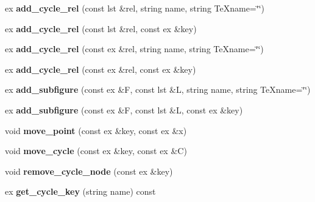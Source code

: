 \begin{DoxyCompactItemize}
ex {\bfseries add\+\_\+cycle\+\_\+rel} (const lst \&rel, string name, string Te\+Xname=\char`\"{}\char`\"{})
\item 
\mbox{\label{class_moeb_inv_1_1figure_a16ef45ff448be79c670c248b8d981ea4}} 
ex {\bfseries add\+\_\+cycle\+\_\+rel} (const lst \&rel, const ex \&key)
\item 
\mbox{\label{class_moeb_inv_1_1figure_ab0f2c91151c526ac334d3c60ceef6ce9}} 
ex {\bfseries add\+\_\+cycle\+\_\+rel} (const ex \&rel, string name, string Te\+Xname=\char`\"{}\char`\"{})
\item 
\mbox{\label{class_moeb_inv_1_1figure_a5f5ba6a6f2501cf2e9b11387e381e754}} 
ex {\bfseries add\+\_\+cycle\+\_\+rel} (const ex \&rel, const ex \&key)
\item 
\mbox{\label{class_moeb_inv_1_1figure_ae479f412608709773b1162261f441386}} 
ex {\bfseries add\+\_\+subfigure} (const ex \&F, const lst \&L, string name, string Te\+Xname=\char`\"{}\char`\"{})
\item 
\mbox{\label{class_moeb_inv_1_1figure_a605a011bf174463556e9280f6ac3da65}} 
ex {\bfseries add\+\_\+subfigure} (const ex \&F, const lst \&L, const ex \&key)
\item 
\mbox{\label{class_moeb_inv_1_1figure_abe4708397c90b19363fd1ec85e66b979}} 
void {\bfseries move\+\_\+point} (const ex \&key, const ex \&x)
\item 
\mbox{\label{class_moeb_inv_1_1figure_a90e556df3666a2c731c361ecdb74fe87}} 
void {\bfseries move\+\_\+cycle} (const ex \&key, const ex \&C)
\item 
\mbox{\label{class_moeb_inv_1_1figure_ac326423d4c370fc0aa8440fa535498f4}} 
void {\bfseries remove\+\_\+cycle\+\_\+node} (const ex \&key)
\item 
\mbox{\label{class_moeb_inv_1_1figure_a1b8387a631822fd57e4efd0735d779c8}} 
ex {\bfseries get\+\_\+cycle\+\_\+key} (string name) const
\item 

\end{DoxyCompactItemize}
